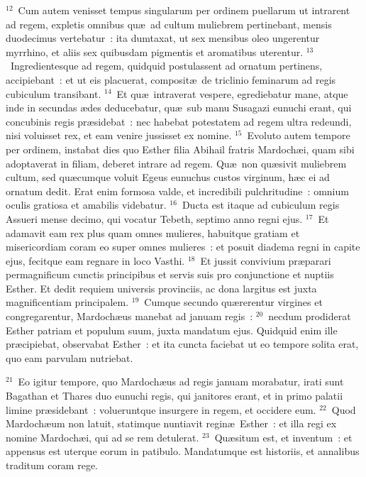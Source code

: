 ${}^{12}$~Cum autem venisset tempus singularum per ordinem puellarum ut intrarent ad regem, expletis omnibus qu\ae\ ad cultum muliebrem pertinebant, mensis duodecimus vertebatur~: ita dumtaxat, ut sex mensibus oleo ungerentur myrrhino, et aliis sex quibusdam pigmentis et aromatibus uterentur.
${}^{13}$~Ingredientesque ad regem, quidquid postulassent ad ornatum pertinens, accipiebant~: et ut eis placuerat, composit\ae\ de triclinio feminarum ad regis cubiculum transibant.
${}^{14}$~Et qu\ae\ intraverat vespere, egrediebatur mane, atque inde in secundas \ae des deducebatur, qu\ae\ sub manu Susagazi eunuchi erant, qui concubinis regis pr\ae sidebat~: nec habebat potestatem ad regem ultra redeundi, nisi voluisset rex, et eam venire jussisset ex nomine.
${}^{15}$~Evoluto autem tempore per ordinem, instabat dies quo Esther filia Abihail fratris Mardoch\ae i, quam sibi adoptaverat in filiam, deberet intrare ad regem. Qu\ae\ non qu\ae sivit muliebrem cultum, sed qu\ae cumque voluit Egeus eunuchus custos virginum, h\ae c ei ad ornatum dedit. Erat enim formosa valde, et incredibili pulchritudine~: omnium oculis gratiosa et amabilis videbatur.
${}^{16}$~Ducta est itaque ad cubiculum regis Assueri mense decimo, qui vocatur Tebeth, septimo anno regni ejus.
${}^{17}$~Et adamavit eam rex plus quam omnes mulieres, habuitque gratiam et misericordiam coram eo super omnes mulieres~: et posuit diadema regni in capite ejus, fecitque eam regnare in loco Vasthi.
${}^{18}$~Et jussit convivium pr\ae parari permagnificum cunctis principibus et servis suis pro conjunctione et nuptiis Esther. Et dedit requiem universis provinciis, ac dona largitus est juxta magnificentiam principalem.
${}^{19}$~Cumque secundo qu\ae rerentur virgines et congregarentur, Mardoch\ae us manebat ad januam regis~:
${}^{20}$~necdum prodiderat Esther patriam et populum suum, juxta mandatum ejus. Quidquid enim ille pr\ae cipiebat, observabat Esther~: et ita cuncta faciebat ut eo tempore solita erat, quo eam parvulam nutriebat.


${}^{21}$~Eo igitur tempore, quo Mardoch\ae us ad regis januam morabatur, irati sunt Bagathan et Thares duo eunuchi regis, qui janitores erant, et in primo palatii limine pr\ae sidebant~: volueruntque insurgere in regem, et occidere eum.
${}^{22}$~Quod Mardoch\ae um non latuit, statimque nuntiavit regin\ae\ Esther~: et illa regi ex nomine Mardoch\ae i, qui ad se rem detulerat.
${}^{23}$~Qu\ae situm est, et inventum~: et appensus est uterque eorum in patibulo. Mandatumque est historiis, et annalibus traditum coram rege.

